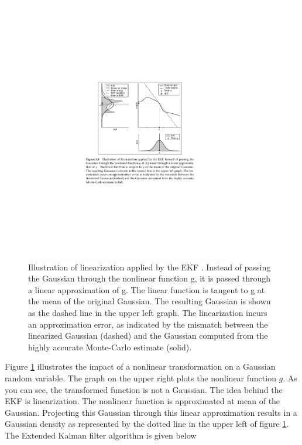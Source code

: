 \documentclass[conference]{IEEEtran}
\begin{document}
\begin{figure}[!t]
\centering
\includegraphics[width=3.5in]{./figures/EkfXform.pdf}
\caption{Illustration of linearization applied by the EKF \cite{thrun}. Instead of passing the Gaussian through the nonlinear function g, it is passed through a linear approximation of g. The linear function is tangent to g at the mean of the original Gaussian. The resulting Gaussian is shown as the dashed line in the upper left graph. The linearization incurs an approximation error, as indicated by the mismatch between the linearized Gaussian (dashed) and the Gaussian computed from the highly accurate Monte-Carlo estimate (solid).}
\label{EkfXform}
\end{figure}

Figure \ref{EkfXform} illustrates the impact of a nonlinear transformation on a Gaussian random variable. The graph on the upper right plots the nonlinear function $g$. As you can see, the transformed function is not a Gaussian. The idea behind the EKF is linearization. The nonlinear function is approximated at mean of the Gaussian. Projecting this Gaussian through this linear approximation results in a Gaussian density as represented by the dotted line in the upper left of figure \ref{EkfXform}.\\

The Extended Kalman filter algorithm is given below
\end{document}

